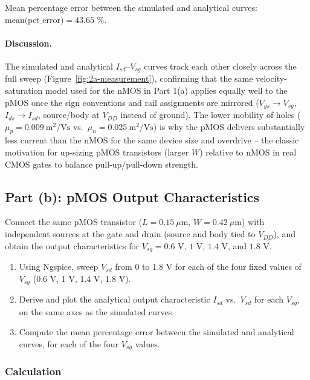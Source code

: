 Mean percentage error between the simulated and analytical curves: $\text{mean(pct\_error)} = 43.65$ \%.

\paragraph{Discussion.} The simulated and analytical $I_{sd}$--$V_{sg}$ curves track each other closely across the full sweep (Figure~\ref{fig:2a-measurement}), confirming that the same velocity-saturation model used for the nMOS in Part 1(a) applies equally well to the pMOS once the sign conventions and rail assignments are mirrored ($V_{gs}\to V_{sg}$, $I_{ds}\to I_{sd}$, source/body at $V_{DD}$ instead of ground). The lower mobility of holes ($\mu_p = 0.009\ \text{m}^2/\text{Vs}$ vs.\ $\mu_n=0.025\ \text{m}^2/\text{Vs}$) is why the pMOS delivers substantially less current than the nMOS for the same device size and overdrive -- the classic motivation for up-sizing pMOS transistors (larger $W$) relative to nMOS in real CMOS gates to balance pull-up/pull-down strength.

\subsection{Part (b): pMOS Output Characteristics}

Connect the same pMOS transistor ($L = 0.15\ \mu\text{m}$, $W = 0.42\ \mu\text{m}$) with independent sources at the gate and drain (source and body tied to $V_{DD}$), and obtain the output characteristics for $V_{sg} = 0.6$ V, $1$ V, $1.4$ V, and $1.8$ V.

\begin{enumerate}
  \item Using Ngspice, sweep $V_{sd}$ from 0 to 1.8 V for each of the four fixed values of $V_{sg}$ (0.6 V, 1 V, 1.4 V, 1.8 V).
  \item Derive and plot the analytical output characteristic $I_{sd}$ vs.\ $V_{sd}$ for each $V_{sg}$, on the same axes as the simulated curves.
  \item Compute the mean percentage error between the simulated and analytical curves, for each of the four $V_{sg}$ values.
\end{enumerate}

\subsubsection{Calculation}

